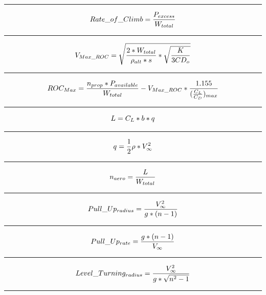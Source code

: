 \documentclass[12pt,A4paper]{article}
\begin{document}
		\hrule
		\vspace{0.1 in}
		\begin{equation}
			Rate\_of\_Climb = \frac{P_{excess}}{W_{total}} \\
		\end{equation}
		\hrule
		\vspace{0.1 in}
		\begin{equation}
			V_{Max\_ROC} = \sqrt{{\frac{2*W_{total}}{\rho_{alt}*s}} * \sqrt{\frac{K}{3CD_o}}} \\
		\end{equation}
		\hrule
		\vspace{0.1 in}
		\begin{equation}
			ROC_{Max} = \frac{n_{prop}*P_{available}}{W_{total}} - V_{Max\_ROC} * \frac{1.155}{(\frac{C_L}{C_D})_{max}} \\
		\end{equation}
		\hrule
		\vspace{0.1 in}
		\begin{equation}
			L = C_L * b * q \\
		\end{equation}
		\hrule
		\vspace{0.1 in}
		\begin{equation}
			q = \frac{1}{2} \rho * V_\infty^2 \\
		\end{equation}
		\hrule
		\vspace{0.1 in}
		\begin{equation}
			n_{aero} = \frac{L}{W_{total}} \\
		\end{equation}
		\hrule
		\vspace{0.1 in}
		\begin{equation}
			Pull\_Up_{radius} = \frac{V_\infty^2}{g*(n-1)} \\
		\end{equation}
		\hrule
		\vspace{0.1 in}
		\begin{equation}
			Pull\_Up_{rate} = \frac{g*(n-1)}{V_\infty} \\
		\end{equation}
		\hrule
		\vspace{0.1 in}
		\vspace{0.1 in}
		\begin{equation}
			Level\_Turning_{radius} = \frac{V_\infty^2}{g*\sqrt{n^2-1}} \\
		\end{equation}
		\hrule
		\vspace{0.1 in}
\end{document}
